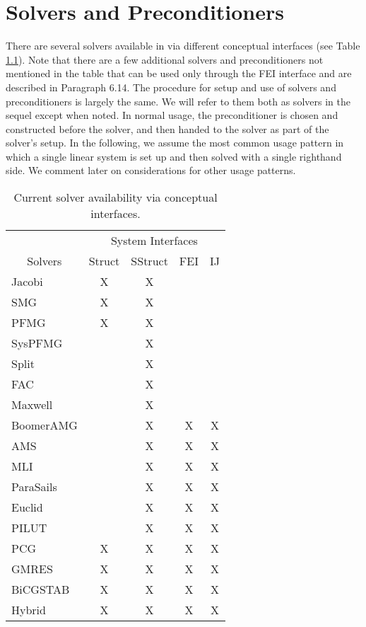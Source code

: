 
\chapter{Solvers and Preconditioners}
\label{ch-Solvers}

There are several solvers available in \hypre{} via different
conceptual interfaces (see Table \ref{table-solver-availability}).
Note that there are a few additional solvers and preconditioners not
mentioned in the table that can be used only through the FEI interface
and are described in Paragraph 6.14.
The procedure for setup and use of solvers and preconditioners is
largely the same. We will refer to them both as solvers in the sequel
except when noted.  In normal usage, the preconditioner is chosen and
constructed before the solver, and then handed to the solver as part
of the solver's setup.  In the following, we assume the most common
usage pattern in which a single linear system is set up and then
solved with a single righthand side. We comment later on
considerations for other usage patterns.

\begin{table}[h]
\center
\begin{tabular}{|l||c|c|c|c|}
\hline
                               & \multicolumn{4}{|c|}{System Interfaces} \\
\multicolumn{1}{|c||}{Solvers} & Struct & SStruct & FEI & IJ \\
\hline\hline
Jacobi     & X & X &   &   \\
SMG        & X & X &   &   \\
PFMG       & X & X &   &   \\
SysPFMG    &   & X &   &   \\
Split      &   & X &   &   \\
FAC        &   & X &   &   \\
Maxwell    &   & X &   &   \\
BoomerAMG  &   & X & X & X \\
AMS        &   & X & X & X \\
MLI        &   & X & X & X \\
ParaSails  &   & X & X & X \\
Euclid     &   & X & X & X \\
PILUT      &   & X & X & X \\
PCG        & X & X & X & X \\
GMRES      & X & X & X & X \\
BiCGSTAB   & X & X & X & X \\
Hybrid     & X & X & X & X \\
\hline
\end{tabular}
\caption{%
Current solver availability via \hypre{} conceptual interfaces.
}
\label{table-solver-availability}
\end{table}

